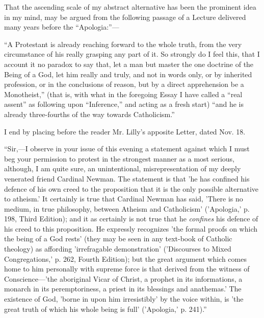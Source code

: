 That the ascending scale of my abstract alternative has been the
prominent idea in my mind, may be argued from the following passage of
a Lecture delivered many years before the ``Apologia:''—


``A Protestant is already reaching forward to the whole truth,
from the very circumstance of his really grasping any part of it. So
strongly do I feel this, that I account it no paradox to say that, let
a man but master the one doctrine of the Being of a God, let him
really and truly, and not in words only, or by inherited profession,
or in the conclusions of reason, but by a direct apprehension be a
Monotheist,'' (that is, with what in the foregoing Essay I have
called a ``real assent'' as following upon
``Inference,'' and acting as a fresh start) ``and he is
already three-fourths of the way towards Catholicism.''


I end by placing before the reader Mr. Lilly's apposite Letter,
dated Nov. 18.


``Sir,—I observe in your issue of this evening a statement
against which I must beg your permission to protest in the strongest
manner as a most serious, although, I am quite sure, an unintentional,
misrepresentation of my deeply venerated friend Cardinal Newman. The
statement is that 'he has confined his defence of his own creed to the
proposition that it is the only possible alternative to atheism.' It
certainly is true that Cardinal Newman has said, 'There is no medium,
in true philosophy, between Atheism and Catholicism' ('Apologia,' p.
198, Third Edition); and it as certainly is not true that he \emph{confines}
his defence of his creed to this proposition. He expressly recognizes
'the formal proofs on which the being of a God rests' (they may be
seen in any text-book of Catholic theology) as affording 'irrefragable
demonstration' ('Discourses to Mixed
Congregations,' p. 262, Fourth
Edition); but the great argument which comes home to him personally
with supreme force is that derived from the witness of Conscience—'the
aboriginal Vicar of Christ, a prophet in its informations, a monarch
in its peremptoriness, a priest in its blessings and anathemas.' The
existence of God, 'borne in upon him irresistibly' by the voice
within, is 'the great truth of which his whole being is full' ('Apologia,' p. 241).''


